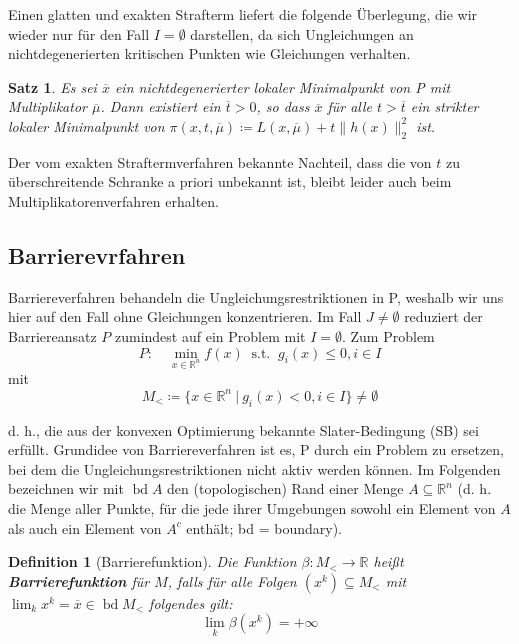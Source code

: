 \documentclass[11pt]{scrreprt}
\newcounter{thm}
\theoremstyle{thmstyle}
\numberwithin{thm}{section}
\newtheorem{definition}[thm]{Definition}
\newtheorem{satz}[thm]{Satz}
\begin{document}
Einen glatten und exakten Strafterm liefert die folgende Überlegung, die wir wieder nur für den Fall $I = \emptyset$ darstellen, da sich Ungleichungen an nichtdegenerierten kritischen Punkten wie Gleichungen verhalten.

\setcounter{thm}{9}

\begin{satz}
	Es sei $\overline{x}$ ein nichtdegenerierter lokaler Minimalpunkt von P mit Multiplikator $\overline{\mu}$. Dann existiert ein  $\overline{t} > 0$, so dass $\overline{x}$ für alle $t > \overline{t}$ ein strikter lokaler Minimalpunkt von $\pi(x, t, \overline{\mu}) \coloneqq L(x, \overline{\mu}) + t \| h(x) \|_2^2$ ist.	
\end{satz}

Der vom exakten Straftermverfahren bekannte Nachteil, dass die von $t$ zu überschreitende Schranke a priori unbekannt ist, bleibt leider auch beim Multiplikatorenverfahren erhalten. 

\subsection*{Barrierevrfahren}


Barriereverfahren behandeln die Ungleichungsrestriktionen in P, weshalb wir uns hier auf den Fall ohne Gleichungen konzentrieren. Im Fall $J \neq \emptyset$ reduziert der Barriereansatz $P$ zumindest auf ein Problem mit $I = \emptyset$. Zum Problem
		$$ P: \quad \min_{x \in \mathbb{R}^n} f(x) ~\text{ s.t. }~ g_i(x) \leq 0, i \in I $$
	mit 
		$$ M_{<} \coloneqq \big\{ x \in \mathbb{R}^n ~|~ g_i(x) < 0, i \in I \big\} \neq \emptyset $$
	
d. h., die aus der konvexen Optimierung bekannte Slater-Bedingung (SB) sei erfüllt. Grundidee von Barriereverfahren ist es, P durch ein Problem zu ersetzen, bei dem die Ungleichungsrestriktionen nicht aktiv werden können. Im Folgenden bezeichnen wir mit $\operatorname{bd}A$ den (topologischen) Rand einer Menge $A\subseteq \mathbb{R}^n$ (d. h. die Menge aller Punkte, für die jede ihrer Umgebungen sowohl ein Element von $A$ als auch ein Element von $A^c$ enthält; bd = boundary).	
	
\begin{definition}[Barrierefunktion]
	Die Funktion $\beta \colon M_< \rightarrow \mathbb{R}$ heißt \textbf{Barrierefunktion} für $M$, falls für alle Folgen $(x^k) \subseteq M_<$ mit $\lim_k x^k = \overline{x} \in \operatorname{bd}M_<$ folgendes gilt:
	$$ \lim_k \beta(x^k) = + \infty $$	
\end{definition}
\end{document}
